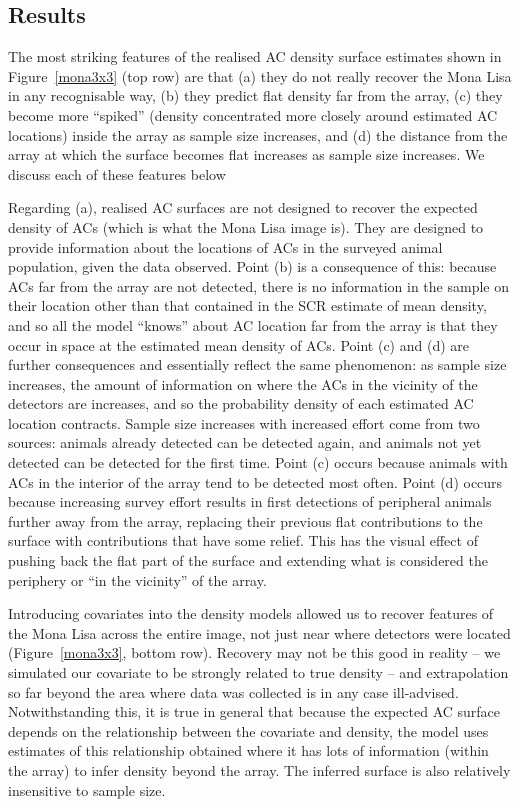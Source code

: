 \documentclass[useAMS,usenatbib,referee]{biom}
\begin{document}
\subsection{Results}
The most striking features of the realised AC density surface estimates shown in Figure~\ref{mona3x3} (top row) are that (a) they do not really recover the Mona Lisa in any recognisable way, (b) they predict flat density far from the array, (c) they become more ``spiked'' (density concentrated more closely around estimated AC locations) inside the array as sample size increases, and (d) the distance from the array at which the surface becomes flat increases as sample size increases. We discuss each of these features below

Regarding (a), realised AC surfaces are not designed to recover the expected density of ACs (which is what the Mona Lisa image is). They are designed to provide information about the locations of ACs in the surveyed animal population, given the data observed. Point (b) is a consequence of this: because ACs far from the array are not detected, there is no information in the sample on their location other than that contained in the SCR estimate of mean density, and so all the model ``knows'' about AC location far from the array is that they occur in space at the estimated mean density of ACs. Point (c) and (d) are further consequences and essentially reflect the same phenomenon: as sample size increases, the amount of information on where the ACs in the vicinity of the detectors are increases, and so the probability density of each estimated AC location contracts. Sample size increases with increased effort come from two sources: animals already detected can be detected again, and animals not yet detected can be detected for the first time. Point (c) occurs because animals with ACs in the interior of the array tend to be detected most often. Point (d) occurs because increasing survey effort results in first detections of peripheral animals further away from the array, replacing their previous flat contributions to the surface with contributions that have some relief. This has the visual effect of pushing back the flat part of the surface and extending what is considered the periphery or ``in the vicinity'' of the array. 

Introducing covariates into the density models allowed us to recover features of the Mona Lisa across the entire image, not just near where detectors were located (Figure~\ref{mona3x3}, bottom row). Recovery may not be this good in reality -- we simulated our covariate to be strongly related to true density -- and extrapolation so far beyond the area where data was collected is in any case ill-advised. Notwithstanding this, it is true in general that because the expected AC surface depends on the relationship between the covariate and density, the model uses estimates of this relationship obtained where it has lots of information (within the array) to infer density beyond the array. The inferred surface is also relatively insensitive to sample size.
\end{document}
